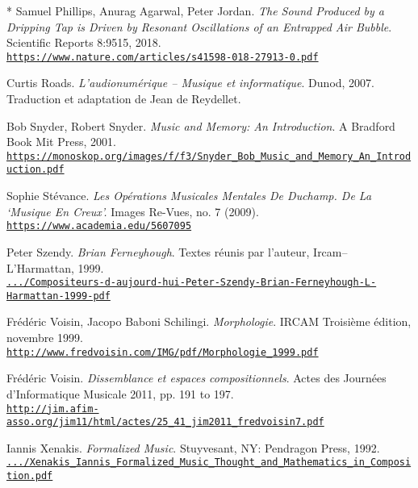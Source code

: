 \begin{thebibliography}{99}
	* Samuel Phillips,  Anurag Agarwal, Peter Jordan. \textit{The Sound Produced by a Dripping Tap is Driven by Resonant Oscillations of an Entrapped Air Bubble}. Scientific Reports 8:9515, 2018.\\ 
	\href{https://www.nature.com/articles/s41598-018-27913-0}{\scriptsize{\texttt{https://www.nature.com/articles/s41598-018-27913-0.pdf}}} \normalsize{}
	
	Curtis Roads. \textit{L'audionumérique -- Musique et informatique}. Dunod, 2007. Traduction et adaptation de Jean de Reydellet.
	
	Bob Snyder, Robert Snyder. \textit{Music and Memory: An Introduction}. A Bradford Book
Mit Press, 2001.\\ 
	\href{https://monoskop.org/images/f/f3/Snyder\_Bob\_Music\_and\_Memory\_An\_Introduction.pdf}{\scriptsize{\texttt{https://monoskop.org/images/f/f3/Snyder\_Bob\_Music\_and\_Memory\_An\_Introduction.pdf}}} \normalsize{}
	
	Sophie Stévance. \textit{Les Opérations Musicales Mentales De Duchamp. De La `Musique En Creux'.} Images Re-Vues, no. 7 (2009). \\ 
	\href{https://www.academia.edu/5607095}{\scriptsize{\texttt{https://www.academia.edu/5607095}}} \normalsize{}
	
	Peter Szendy. \textit{Brian Ferneyhough}. Textes réunis par l'auteur, Ircam--L'Har\-mattan, 1999.\\ 
	\href{https://www.scribd.com/document/365564172/Compositeurs-d-aujourd-hui-Peter-Szendy-Brian-Ferneyhough-L-Harmattan-1999-pdf}{\scriptsize{\texttt{.../Compositeurs-d-aujourd-hui-Peter-Szendy-Brian-Ferneyhough-L-Harmattan-1999-pdf}}} \normalsize{}
			
	Fr\'{e}d\'{e}ric Voisin, Jacopo Baboni Schilingi. \textit{Morphologie}. IRCAM Troisi\`{e}me \'{e}dition, novembre 1999.\\ 
	\href{http://www.fredvoisin.com/IMG/pdf/Morphologie\_1999.pdf}{\scriptsize{\texttt{http://www.fredvoisin.com/IMG/pdf/Morphologie\_1999.pdf}}} \normalsize{}
	
	Fr\'{e}d\'{e}ric Voisin. \textit{Dissemblance et espaces compositionnels}. Actes des Journées d’Informatique Musicale 2011, pp. 191 to 197.\\ 
	\href{http://jim.afim-asso.org/jim11/html/actes/25\_41\_jim2011\_fredvoisin7.pdf}{\scriptsize{\texttt{http://jim.afim-asso.org/jim11/html/actes/25\_41\_jim2011\_fredvoisin7.pdf}}} \normalsize{}

	Iannis Xenakis. \textit{Formalized Music}. Stuyvesant, NY: Pendragon Press, 1992.\\ 
	\href{https://monoskop.org/images/7/74/Xenakis\_Iannis\_Formalized\_Music\_Thought\_and\_Mathematics\_in\_Composition.pdf}{\scriptsize{\texttt{.../Xenakis\_Iannis\_Formalized\_Music\_Thought\_and\_Mathematics\_in\_Composition.pdf}}} \normalsize{}

\end{thebibliography}